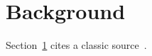 \documentclass{article}
\begin{document}
\section{Background}
\label{sec:background}
Section~\ref{sec:background} cites a classic source~\cite{knuth1984texbook}.


\end{document}
